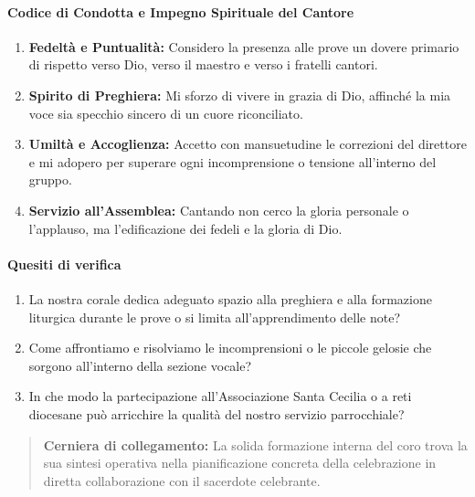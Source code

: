\documentclass[12pt,a4paper]{article}
\begin{document}
	\paragraph{Codice di Condotta e Impegno Spirituale del Cantore}\label{codice-di-condotta-e-impegno-spirituale-del-cantore}
	
	\begin{enumerate}[label=\arabic*.,leftmargin=*]
		\item \textbf{Fedeltà e Puntualità:} Considero la presenza alle prove un dovere primario di rispetto verso Dio, verso il maestro e verso i fratelli cantori.
		\item \textbf{Spirito di Preghiera:} Mi sforzo di vivere in grazia di Dio, affinché la mia voce sia specchio sincero di un cuore riconciliato.
		\item \textbf{Umiltà e Accoglienza:} Accetto con mansuetudine le correzioni del direttore e mi adopero per superare ogni incomprensione o tensione all'interno del gruppo.
		\item \textbf{Servizio all'Assemblea:} Cantando non cerco la gloria personale o l'applauso, ma l'edificazione dei fedeli e la gloria di Dio.
	\end{enumerate}
	
	\paragraph{Quesiti di verifica}\label{quesiti-di-verifica-1}
	
	\begin{enumerate}[label=\arabic*.,leftmargin=*]
		\item La nostra corale dedica adeguato spazio alla preghiera e alla formazione liturgica durante le prove o si limita all'apprendimento delle note?
		\item Come affrontiamo e risolviamo le incomprensioni o le piccole gelosie che sorgono all'interno della sezione vocale?
		\item In che modo la partecipazione all'Associazione Santa Cecilia o a reti diocesane può arricchire la qualità del nostro servizio parrocchiale?
	\end{enumerate}
	
	\begin{quote}
		\textbf{Cerniera di collegamento:} La solida formazione interna del coro trova la sua sintesi operativa nella pianificazione concreta della celebrazione in diretta collaborazione con il sacerdote celebrante.
	\end{quote}
	
\end{document}
